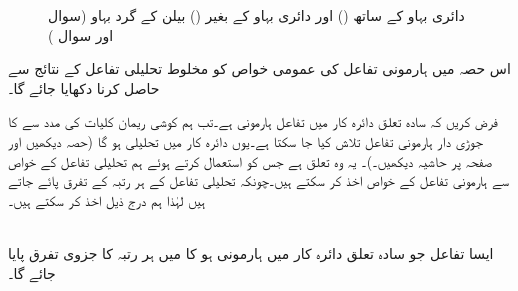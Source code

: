 \begin{figure}
\begin{subfigure}{0.45\textwidth}
\end{subfigure}
\caption{دائری بہاو کے ساتھ () اور دائری بہاو کے بغیر () بیلن کے گرد بہاو (سوال  اور سوال )}
\label{شکل_سوال_مخفی_قوہ_بیلن_کے_گرد}
\end{figure}


اس حصہ میں ہارمونی تفاعل کی عمومی خواص کو مخلوط تحلیلی تفاعل کے نتائج سے حاصل کرنا دکھایا جائے گا۔

فرض کریں کہ سادہ تعلق دائرہ کار  میں تفاعل  ہارمونی ہے۔تب ہم کوشی ریمان کلیات کی مدد سے  کا جوڑی دار ہارمونی تفاعل  تلاش کیا جا سکتا ہے۔یوں   دائرہ کار  میں تحلیلی ہو گا (حصہ  دیکھیں اور  صفحہ  پر حاشیہ دیکھیں۔)۔ یہ وہ تعلق ہے جس کو استعمال کرتے ہوئے ہم تحلیلی تفاعل کے خواص سے ہارمونی تفاعل کے خواص اخذ کر سکتے ہیں۔چونکہ تحلیلی تفاعل کے ہر رتبہ کے تفرق پائے جاتے ہیں لہٰذا ہم درج ذیل اخذ کر سکتے ہیں۔

\quad {}\\
 ایسا تفاعل  جو سادہ تعلق دائرہ کار  میں ہارمونی ہو کا   میں ہر رتبہ کا جزوی تفرق پایا جائے گا۔  

